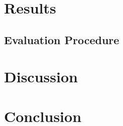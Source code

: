 \documentclass[12pt,a4paper]{report}
\begin{document}
\chapter{Results}
\label{sec:results}

\section{Evaluation Procedure}
\label{sec:evaluation}

\subsection{}

\chapter{Discussion}
\label{sec:dicussion}


\chapter{Conclusion}
\label{sec:conclusion}


\printbibliography

\appendix
\end{document}
